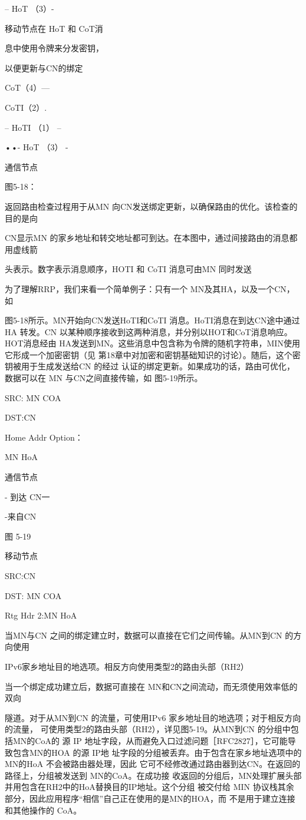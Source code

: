 -- HoT （3）-

移动节点在 HoT 和 CoT消

息中使用令牌来分发密钥，

以便更新与CN的绑定

CoT（4）—

CoTI（2）.

-- HoTI （1） --

••- HoT （3） -

通信节点

图5-18：

返回路由检查过程用于从MN 向CN发送绑定更新，以确保路由的优化。该检查的目的是向

CN显示MN 的家乡地址和转交地址都可到达。在本图中，通过间接路由的消息都用虚线箭

头表示。数字表示消息顺序，HOTI 和 CoTI 消息可由MN 同时发送

为了理解RRP，我们来看一个简单例子：只有一个 MN及其HA，以及一个CN，如

图5-18所示。MN开始向CN发送HoTI和CoTI 消息。HoTI消息在到达CN途中通过HA
转发。CN 以某种顺序接收到这两种消息，并分别以HOT和CoT消息响应。HOT消息经由
HA发送到MN。这些消息中包含称为令牌的随机字符串，MIN使用它形成一个加密密钥（见
第18章中对加密和密钥基础知识的讨论）。随后，这个密钥被用于生成发送给CN 的经过
认证的绑定更新。如果成功的话，路由可优化，数据可以在 MN 与CN之间直接传输，如
图5-19所示。

SRC: MN COA

DST:CN

Home Addr Option：

MN HoA

通信节点

- 到达 CN一

-来自CN

图 5-19

移动节点

SRC:CN

DST: MN COA

Rtg Hdr 2:MN HoA

当MN与CN 之间的绑定建立时，数据可以直接在它们之间传输。从MN到CN 的方向使用

IPv6家乡地址目的地选项。相反方向使用类型2的路由头部（RH2）

当一个绑定成功建立后，数据可直接在 MN和CN之间流动，而无须使用效率低的双向

隧道。对于从MN到CN 的流量，可使用IPv6 家乡地址目的地选项；对于相反方向的流量，
可使用类型2的路由头部（RH2），详见图5-19。从MN到CN 的分组中包括MN的CoA的
源 IP 地址字段，从而避免入口过滤问题［RFC2827］，它可能导致包含MN的HOA 的源 IP地
址字段的分组被丢弃。由于包含在家乡地址选项中的MN的HoA 不会被路由器处理，因此
它可不经修改通过路由器到达CN。在返回的路径上，分组被发送到 MN的CoA。在成功接
收返回的分组后，MN处理扩展头部并用包含在RH2中的HoA替换目的IP地址。这个分组
被交付给 MIN 协议栈其余部分，因此应用程序“相信”自己正在使用的是MN的HOA，而
不是用于建立连接和其他操作的 CoA。


